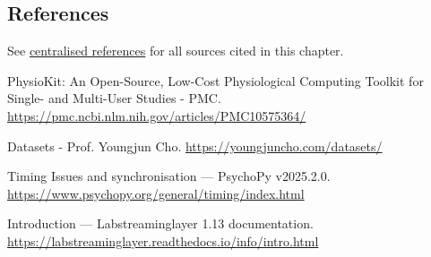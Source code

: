 \documentclass{report}
\begin{document}
    \subsection*{References}
    See \href{references.md}{centralised references} for all sources cited in this chapter.

    \begin{thebibliography}{9}

        PhysioKit: An Open-Source, Low-Cost Physiological Computing Toolkit for Single- and Multi-User Studies - PMC.
        \url{https://pmc.ncbi.nlm.nih.gov/articles/PMC10575364/}

        Datasets - Prof. Youngjun Cho.
        \url{https://youngjuncho.com/datasets/}

        Timing Issues and synchronisation --- PsychoPy v2025.2.0.
        \url{https://www.psychopy.org/general/timing/index.html}

        Introduction --- Labstreaminglayer 1.13 documentation.
        \url{https://labstreaminglayer.readthedocs.io/info/intro.html}

    \end{thebibliography}
\end{document}

